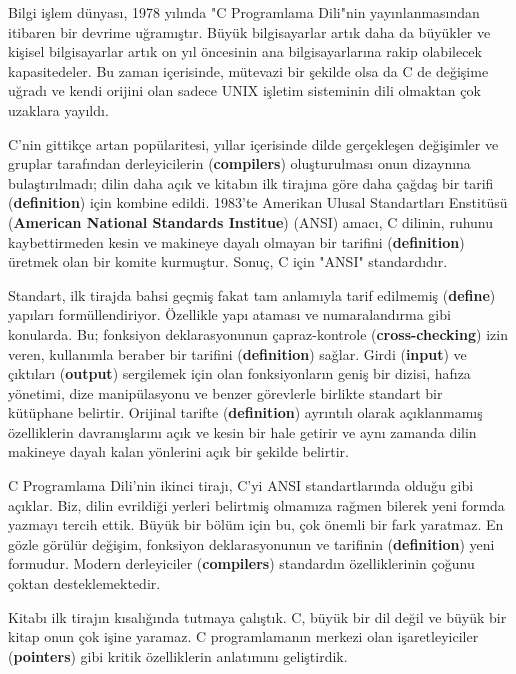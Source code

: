 \documentclass[a4paper,12pt,oneside]{book}
\begin{document}
Bilgi işlem dünyası, 1978 yılında "C Programlama Dili"nin yayınlanmasından itibaren bir devrime uğramıştır. Büyük bilgisayarlar artık daha da büyükler ve kişisel bilgisayarlar artık on yıl öncesinin ana bilgisayarlarına rakip olabilecek kapasitedeler. Bu zaman içerisinde, mütevazi bir şekilde olsa da C de değişime uğradı ve kendi orijini olan sadece UNIX işletim sisteminin dili olmaktan çok uzaklara yayıldı.
\par C'nin gittikçe artan popülaritesi, yıllar içerisinde dilde gerçekleşen değişimler ve gruplar tarafından derleyicilerin (\textbf{compilers}) oluşturulması onun dizaynına bulaştırılmadı; dilin daha açık ve kitabın ilk tirajına göre daha çağdaş bir tarifi (\textbf{definition}) için kombine edildi. 1983'te Amerikan Ulusal Standartları Enstitüsü (\textbf{American National Standards Institue}) (ANSI) amacı, C dilinin, ruhunu kaybettirmeden kesin ve makineye dayalı olmayan bir tarifini (\textbf{definition}) üretmek olan bir komite kurmuştur. Sonuç, C için "ANSI" standardıdır.
\par Standart, ilk tirajda bahsi geçmiş fakat tam anlamıyla tarif edilmemiş (\textbf{define}) yapıları formüllendiriyor. Özellikle yapı ataması ve numaralandırma gibi konularda. Bu; fonksiyon deklarasyonunun çapraz-kontrole (\textbf{cross-checking}) izin veren, kullanımla beraber bir tarifini (\textbf{definition}) sağlar. Girdi (\textbf{input}) ve çıktıları (\textbf{output}) sergilemek için olan fonksiyonların  geniş bir dizisi, hafıza yönetimi, dize manipülasyonu ve benzer görevlerle birlikte standart bir kütüphane belirtir. Orijinal tarifte (\textbf{definition}) ayrıntılı olarak açıklanmamış özelliklerin davranışlarını açık ve kesin bir hale getirir ve aynı zamanda dilin makineye dayalı kalan yönlerini açık bir şekilde belirtir.
\par C Programlama Dili'nin ikinci tirajı, C'yi ANSI standartlarında olduğu gibi açıklar. Biz, dilin evrildiği yerleri belirtmiş olmamıza rağmen bilerek yeni formda yazmayı tercih ettik. Büyük bir bölüm için bu, çok önemli bir fark yaratmaz. En gözle görülür değişim, fonksiyon  deklarasyonunun ve tarifinin (\textbf{definition}) yeni formudur. Modern derleyiciler (\textbf{compilers}) standardın özelliklerinin çoğunu çoktan desteklemektedir.
\par Kitabı ilk tirajın kısalığında tutmaya çalıştık. C, büyük bir dil değil ve büyük bir kitap onun çok işine yaramaz. \pagebreak
C programlamanın merkezi olan işaretleyiciler (\textbf{pointers}) gibi kritik özelliklerin anlatımını geliştirdik.
\end{document}
